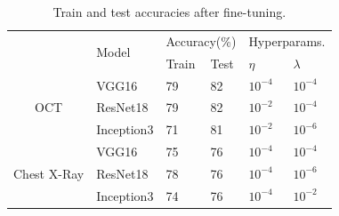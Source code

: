 \begin{table}[ht]
\begin{tabular}{|c|l|l|l|l|l|l|}
\hline
\multicolumn{1}{|l|}{\multirow{3}{*}{}} & \multirow{3}{*}{Model} & \multicolumn{2}{l|}{\multirow{2}{*}{Accuracy(\%)}} & \multicolumn{3}{l|}{\multirow{2}{*}{Hyperparams.}} \\
\multicolumn{1}{|l|}{} &  & \multicolumn{2}{l|}{} & \multicolumn{3}{l|}{} \\ \cline{3-7} 
\multicolumn{1}{|l|}{} &  & Train & Test & \multicolumn{2}{l|}{$\eta$} & $\lambda$ \\ \hline
\multirow{3}{*}{OCT} & VGG16 & 79 & 82 & \multicolumn{2}{l|}{$10^{-4}$} & $10^{-4}$ \\ \cline{2-7} 
 & ResNet18 & 79 & 82 & \multicolumn{2}{l|}{$10^{-2}$} & $10^{-4}$ \\ \cline{2-7} 
 & Inception3 & 71 & 81 & \multicolumn{2}{l|}{$10^{-2}$} & $10^{-6}$ \\ \hline
\multirow{3}{*}{Chest X-Ray} & VGG16 & 75 & 76 & \multicolumn{2}{l|}{$10^{-4}$} & $10^{-4}$ \\ \cline{2-7} 
 & ResNet18 & 78 & 76 & \multicolumn{2}{l|}{$10^{-4}$} & $10^{-6}$ \\ \cline{2-7} 
 & Inception3 & 74 & 76 & \multicolumn{2}{l|}{$10^{-4}$} & $10^{-2}$ \\ \hline
\end{tabular}
\caption{Train and test accuracies after fine-tuning.}
\label{tbl:finetune_accuracies}
\end{table}

